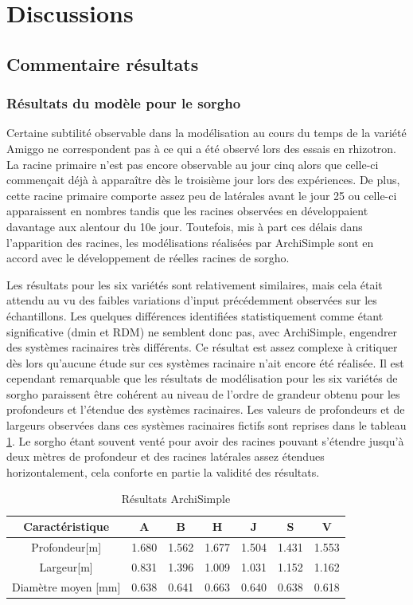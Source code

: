 \section{Discussions}

\subsection{Commentaire résultats}

\subsubsection{Résultats du modèle pour le sorgho}

Certaine subtilité observable dans la modélisation au cours du temps de la variété Amiggo ne correspondent pas à ce qui a été observé lors des essais en rhizotron.
La racine primaire n'est pas encore observable au jour cinq alors que celle-ci commençait déjà à apparaître dès le troisième jour lors des expériences.
De plus, cette racine primaire comporte assez peu de latérales avant le jour 25 ou celle-ci apparaissent en nombres tandis que les racines observées en développaient davantage aux alentour du 10e jour.
Toutefois, mis à part ces délais dans l'apparition des racines, les modélisations réalisées par ArchiSimple sont en accord avec le développement de réelles racines de sorgho.
\newline

Les résultats pour les six variétés sont relativement similaires, mais cela était attendu au vu des faibles variations d'input précédemment observées sur les échantillons.
Les quelques différences identifiées statistiquement comme étant significative (dmin et RDM) ne semblent donc pas, avec ArchiSimple, engendrer des systèmes racinaires très différents.
Ce résultat est assez complexe à critiquer dès lors qu'aucune étude sur ces systèmes racinaire n'ait encore été réalisée.
Il est cependant remarquable que les résultats de modélisation pour les six variétés de sorgho paraissent être cohérent au niveau de l'ordre de grandeur obtenu pour les profondeurs et l'étendue des systèmes racinaires.
Les valeurs de profondeurs et de largeurs observées dans ces systèmes racinaires fictifs sont reprises dans le tableau \ref{tab:roots}.
Le sorgho étant souvent venté pour avoir des racines pouvant s'étendre jusqu'à deux mètres de profondeur et des racines latérales assez étendues horizontalement, cela conforte en partie la validité des résultats.

\begin{table}[ht]
    \centering
    \caption{Résultats ArchiSimple}
    \begin{tabular}{c|c c c c c c}
    Caractéristique & A & B & H & J & S & V \\
    \hline 
    Profondeur[m] & 1.680 & 1.562 & 1.677 & 1.504 & 1.431 & 1.553 \\
    Largeur[m] & 0.831 & 1.396 & 1.009 & 1.031 & 1.152 & 1.162 \\
    Diamètre moyen [mm] & 0.638 & 0.641 & 0.663 & 0.640 & 0.638 & 0.618
    \end{tabular}
    \label{tab:roots}
\end{table}

